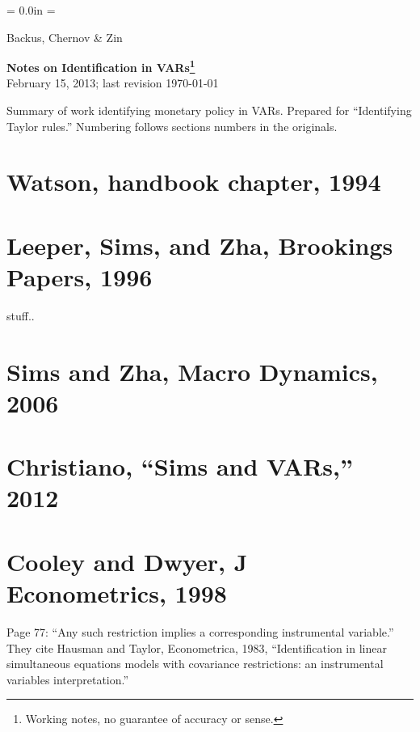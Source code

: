 \documentclass[11pt]{article}
\begin{document}
\thispagestyle{empty}
\parindent = 0.0in
\parskip = \bigskipamount

\begin{flushright}
Backus, Chernov \& Zin
\end{flushright}

\begin{center}
{\Large\bf Notes on Identification in VARs\footnote{%
Working notes, no guarantee of accuracy or sense.}
} \\
February 15, 2013; last revision \today
\end{center}

Summary of work identifying monetary policy in VARs.
Prepared for ``Identifying Taylor rules.''
Numbering follows sections numbers in the originals. 


\section*{Watson, handbook chapter, 1994}





\section*{Leeper, Sims, and Zha, Brookings Papers, 1996}

stuff..


\section*{Sims and Zha, Macro Dynamics, 2006}




\section*{Christiano, ``Sims and VARs,'' 2012}


\section*{Cooley and Dwyer, J Econometrics, 1998}

Page 77:  ``Any such restriction implies a corresponding instrumental variable.'' 
They cite Hausman and Taylor, Econometrica, 1983, 
``Identification in linear simultaneous equations models with covariance restrictions: an instrumental variables interpretation.''
\end{document}

